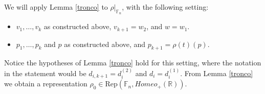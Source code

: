 \documentclass[12pt]{article}
\newcommand{\F}{\mathbb{F}}
\newcommand{\R}{\mathbb{R}}
\theoremstyle{definition}
\begin{document}
We will apply Lemma \ref{tronco} to $\rho|_{\F_n}$, with the following setting:
\begin{itemize}
\item $v_1,\ldots,v_k$ as constructed above, $v_{k+1}=w_2$, and $w=w_1$.
\item $p_1,\ldots,p_k$ and $p$ as constructed above, and $p_{k+1}=\rho(t)(p)$.    
\end{itemize}

Notice the hypotheses of Lemma \ref{tronco} hold for this setting, where the notation in the statement would be $d_{i,k+1}= d_i^{(2)}$ and $d_i=d_i^{(1)}$. From Lemma \ref{tronco} we obtain a representation $\rho_0\in \text{Rep}(\F_n,Homeo_{+}(\R))$.


 





\end{document}
